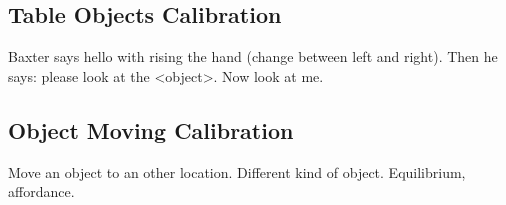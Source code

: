 \documentclass[11pt,a4paper]{article}
\begin{document}
\subsection{Table Objects Calibration}
Baxter says hello with rising the hand (change between left and right). Then he says: please look at the <object>. Now look at me.
\subsection{Object Moving Calibration}
Move an object to an other location. Different kind of object. Equilibrium, affordance.


\clearpage


\end{document}
